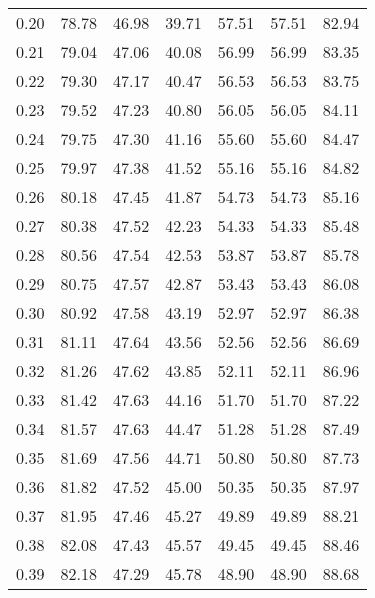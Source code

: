 \begin{tabular}{|c|c|c|c|c|c|c|}
      0.20 &     78.78 &     46.98 &      39.71 &   57.51 &      57.51 &         82.94 \\
      0.21 &     79.04 &     47.06 &      40.08 &   56.99 &      56.99 &         83.35 \\
      0.22 &     79.30 &     47.17 &      40.47 &   56.53 &      56.53 &         83.75 \\
      0.23 &     79.52 &     47.23 &      40.80 &   56.05 &      56.05 &         84.11 \\
      0.24 &     79.75 &     47.30 &      41.16 &   55.60 &      55.60 &         84.47 \\
      0.25 &     79.97 &     47.38 &      41.52 &   55.16 &      55.16 &         84.82 \\
      0.26 &     80.18 &     47.45 &      41.87 &   54.73 &      54.73 &         85.16 \\
      0.27 &     80.38 &     47.52 &      42.23 &   54.33 &      54.33 &         85.48 \\
      0.28 &     80.56 &     47.54 &      42.53 &   53.87 &      53.87 &         85.78 \\
      0.29 &     80.75 &     47.57 &      42.87 &   53.43 &      53.43 &         86.08 \\
      0.30 &     80.92 &     47.58 &      43.19 &   52.97 &      52.97 &         86.38 \\
      0.31 &     81.11 &     47.64 &      43.56 &   52.56 &      52.56 &         86.69 \\
      0.32 &     81.26 &     47.62 &      43.85 &   52.11 &      52.11 &         86.96 \\
      0.33 &     81.42 &     47.63 &      44.16 &   51.70 &      51.70 &         87.22 \\
      0.34 &     81.57 &     47.63 &      44.47 &   51.28 &      51.28 &         87.49 \\
      0.35 &     81.69 &     47.56 &      44.71 &   50.80 &      50.80 &         87.73 \\
      0.36 &     81.82 &     47.52 &      45.00 &   50.35 &      50.35 &         87.97 \\
      0.37 &     81.95 &     47.46 &      45.27 &   49.89 &      49.89 &         88.21 \\
      0.38 &     82.08 &     47.43 &      45.57 &   49.45 &      49.45 &         88.46 \\
      0.39 &     82.18 &     47.29 &      45.78 &   48.90 &      48.90 &         88.68 \\

\end{tabular}
